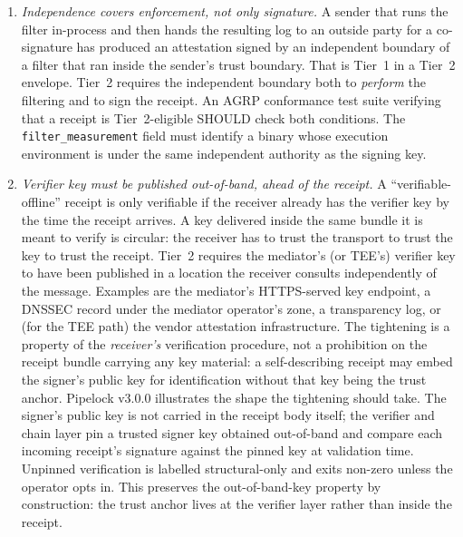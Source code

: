 \begin{enumerate}
  \item \emph{Independence covers enforcement, not
    only signature.} A sender that runs the filter
    in-process and then hands the resulting log to an
    outside party for a co-signature has produced an
    attestation signed by an independent boundary of a
    filter that ran inside the sender's trust boundary.
    That is Tier~1 in a Tier~2 envelope. Tier~2
    requires the independent boundary both to
    \emph{perform} the filtering and to sign the
    receipt. An AGRP conformance test suite verifying
    that a receipt is Tier~2-eligible SHOULD check both
    conditions. The \texttt{filter\_measurement}
    field must identify a binary whose execution
    environment is under the same independent
    authority as the signing key.
  \item \emph{Verifier key must be published
    out-of-band, ahead of the receipt.} A
    ``verifiable-offline'' receipt is only verifiable
    if the receiver already has the verifier key by
    the time the receipt arrives. A key delivered
    inside the same bundle it is meant to verify is
    circular: the receiver has to trust the transport
    to trust the key to trust the receipt. Tier~2
    requires the mediator's (or TEE's) verifier key to
    have been published in a location the receiver
    consults independently of the message. Examples are
    the mediator's HTTPS-served key endpoint, a DNSSEC
    record under the mediator operator's zone, a
    transparency log, or (for the TEE path) the vendor
    attestation infrastructure. The tightening is a
    property of the \emph{receiver's} verification
    procedure, not a prohibition on the receipt bundle
    carrying any key material: a self-describing
    receipt may embed the signer's public key for
    identification without that key being the trust
    anchor. Pipelock v3.0.0 illustrates the shape the
    tightening should take. The signer's public key is
    not carried in the receipt body itself; the verifier
    and chain layer pin a trusted signer key obtained
    out-of-band and compare each incoming receipt's
    signature against the pinned key at validation time.
    Unpinned verification is labelled structural-only and
    exits non-zero unless the operator opts in. This
    preserves the out-of-band-key property by
    construction: the trust anchor lives at the verifier
    layer rather than inside the receipt.
\end{enumerate}

